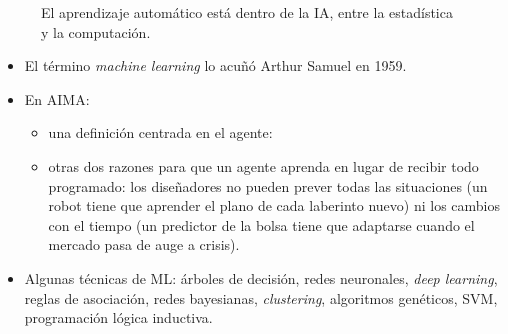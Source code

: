 \documentclass[11pt,a4paper]{article}
\begin{document}
\begin{figure}[h]
\centering
{}
\caption{El aprendizaje automático está dentro de la IA, entre la estadística y la computación.}
\end{figure}

\begin{extras}
\begin{itemize}
  \item El término \textit{machine learning} lo acuñó Arthur Samuel en 1959.
  \item En AIMA:
  \begin{itemize}
    \item una definición centrada en el agente: 
    \item otras dos razones para que un agente aprenda en lugar de recibir todo programado: los diseñadores no pueden prever todas las situaciones (un robot tiene que aprender el plano de cada laberinto nuevo) ni los cambios con el tiempo (un predictor de la bolsa tiene que adaptarse cuando el mercado pasa de auge a crisis).
  \end{itemize}
  \item Algunas técnicas de ML: árboles de decisión, redes neuronales, \textit{deep learning}, reglas de asociación, redes bayesianas, \textit{clustering}, algoritmos genéticos, SVM, programación lógica inductiva.
\end{itemize}
\end{extras}

\end{document}
